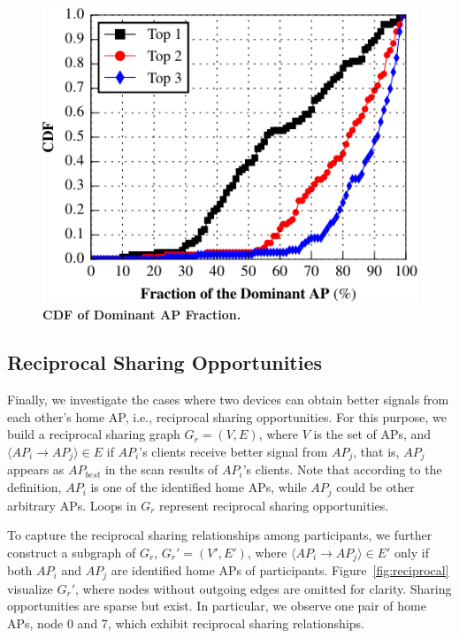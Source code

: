 \begin{figure}[t]
  \centering
  \includegraphics[width=\columnwidth]{./figures/DominantNeighborAPFigure.pdf}
  \caption{\textbf{CDF of Dominant AP Fraction.}}
  \label{fig:dominantap}
  \vspace*{-4mm}
\end{figure}

\subsection{Reciprocal Sharing Opportunities}
\label{subsec:reciprocal}

Finally, we investigate the cases where two devices can obtain better signals
from each other's home AP, i.e., reciprocal sharing opportunities. For this
purpose, we build a reciprocal sharing graph $G_r=(V, E)$, where $V$ is the set
of APs, and $\langle AP_i \rightarrow AP_j \rangle \in E$ if $AP_i$'s clients
receive better signal from $AP_j$, that is, $AP_j$ appears as $AP_{best}$ in the
scan results of $AP_i$'s clients. Note that according to the definition, $AP_i$
is one of the identified home APs, while $AP_j$ could be other arbitrary APs.
Loops in $G_r$ represent reciprocal sharing opportunities.

To capture the reciprocal sharing relationships among \PhoneLab{} participants,
we further construct a subgraph of $G_r$, $G_r'=(V', E')$, where $\langle AP_i
\rightarrow AP_j \rangle \in E'$ only if both $AP_i$ and $AP_j$ are identified
home APs of \PhoneLab{} participants. Figure~\ref{fig:reciprocal} visualize
$G_r'$, where nodes without outgoing edges are omitted for clarity. Sharing
opportunities are sparse but exist. In particular, we observe one pair of home
APs, node 0 and 7, which exhibit reciprocal sharing relationships.

